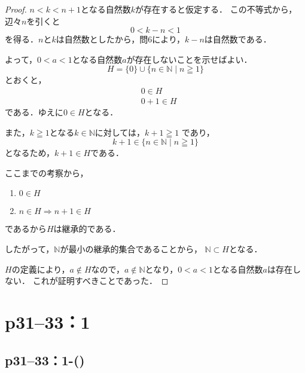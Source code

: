 \documentclass[a4paper,10pt,fleqn]{ltjsarticle}
\begin{document}
\begin{tleftbar}
    \begin{proof}
        $n < k < n+1$となる自然数$k$が存在すると仮定する．
        この不等式から，辺々$n$を引くと
        \[
            0 < k - n < 1
        \]
        を得る．$n$と$k$は自然数としたから，問6により，$k-n$は自然数である．

        よって，$0<a<1$となる自然数$a$が存在しないことを示せばよい．
        \[
            H=\{0\} \cup \{n \in \mathbb{N} \mid n \geqq 1 \}
        \]
        とおくと，
        \begin{align*}
             & 0 \in H   \\
             & 0+1 \in H
        \end{align*}
        である．ゆえに$ 0 \in H$となる．

        また，$k \geqq 1$となる$k \in \mathbb{N}$に対しては，$k +1 \geqq 1$
        であり，
        \[
            k+1 \in \{n \in \mathbb{N} \mid n \geqq 1 \}
        \]
        となるため，$k+1 \in H$である．

        ここまでの考察から，
        \begin{enumerate}
            \item $0 \in H$
            \item $n \in H \Longrightarrow n+1 \in H$
        \end{enumerate}
        であるから$H$は継承的である．

        したがって，$\mathbb{N}$が最小の継承的集合であることから，
        $\mathbb{N} \subset H$となる．

        $H$の定義により，$a \notin H$なので，$a \notin \mathbb{N}$となり，$0<a<1$となる自然数$a$は存在しない．
        これが証明すべきことであった．
    \end{proof}
\end{tleftbar}

\newpage

\section*{p31--33：1}


\subsection*{p31--33：1-()}
\end{document}
